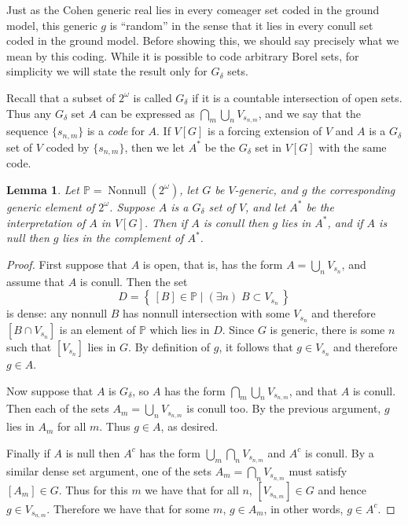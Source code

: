 \documentclass[11pt,oneside]{amsbook}
\newcommand{\set}[1]{\left\{\,#1\,\right\}}
\newcommand{\PP}{\mathbb P}
\DeclareMathOperator{\Nonnull}{Nonnull}
\theoremstyle{definition}
\theoremstyle{plain}
\newtheorem{lemma}[theorem]{Lemma}
\theoremstyle{definition}
\theoremstyle{remark}
\numberwithin{equation}{section}
\numberwithin{figure}{section}
\begin{document}
Just as the Cohen generic real lies in every comeager set coded in the ground model, this generic $g$ is ``random'' in the sense that it lies in every conull set coded in the ground model. Before showing this, we should say precisely what we mean by this coding. While it is possible to code arbitrary Borel sets, for simplicity we will state the result only for $G_\delta$ sets. 

Recall that a subset of $2^\omega$ is called $G_\delta$ if it is a countable intersection of open sets. Thus any $G_\delta$ set $A$ can be expressed as $\bigcap_m\bigcup_nV_{s_{n,m}}$, and we say that the sequence $\{s_{n,m}\}$ is a \emph{code} for $A$. If $V[G]$ is a forcing extension of $V$ and $A$ is a $G_\delta$ set of $V$ coded by $\{s_{n,m}\}$, then we let $A^*$ be the $G_\delta$ set in $V[G]$ with the same code.

\begin{lemma}
  \label{lem:random-conull}
  Let $\PP=\Nonnull(2^\omega)$, let $G$ be $V$-generic, and $g$ the corresponding generic element of $2^\omega$. Suppose $A$ is a $G_\delta$ set of $V$, and let $A^*$ be the interpretation of $A$ in $V[G]$. Then if $A$ is conull then $g$ lies in $A^*$, and if $A$ is null then $g$ lies in the complement of $A^*$.
\end{lemma}

\begin{proof}
  First suppose that $A$ is open, that is, has the form $A=\bigcup_nV_{s_n}$, and assume that $A$ is conull. Then the set
  \[D=\set{[B]\in\PP\mid (\exists n)\;B\subset V_{s_n}}
  \]
  is dense: any nonnull $B$ has nonnull intersection with some $V_{s_n}$ and therefore $[B\cap V_{s_n}]$ is an element of $\PP$ which lies in $D$. Since $G$ is generic, there is some $n$ such that $[V_{s_n}]$ lies in $G$. By definition of $g$, it follows that $g\in V_{s_n}$ and therefore $g\in A$.

  Now suppose that $A$ is $G_\delta$, so $A$ has the form $\bigcap_m\bigcup_nV_{s_{n,m}}$, and that $A$ is conull. Then each of the sets $A_m=\bigcup_nV_{s_{n,m}}$ is conull too. By the previous argument, $g$ lies in $A_m$ for all $m$. Thus $g\in A$, as desired.

  Finally if $A$ is null then $A^c$ has the form $\bigcup_m\bigcap_nV_{s_{n,m}}$ and $A^c$ is conull. By a similar dense set argument, one of the sets $A_m=\bigcap_nV_{s_{n,m}}$ must satisfy $[A_m]\in G$. Thus for this $m$ we have that for all $n$, $[V_{s_{n,m}}]\in G$ and hence $g\in V_{s_{n,m}}$. Therefore we have that for some $m$, $g\in A_m$, in other words, $g\in A^c$.
\end{proof}
\end{document}
